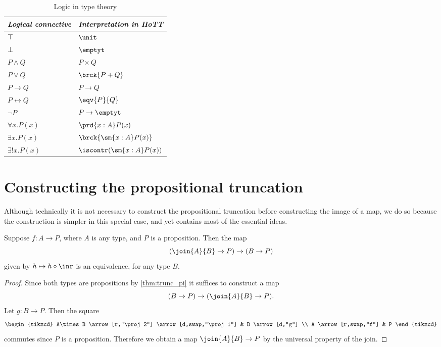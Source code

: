 \begin{table}
\caption{\label{table:logic}Logic in type theory}
\begin{center}
\begin{tabular}{ll}
\toprule
\emph{Logical connective} & \emph{Interpretation in HoTT} \\
\midrule
$\top$ & $\unit$ \\
$\bot$ & $\emptyt$ \\
$P\land Q$ & $P\times Q$ \\
$P\lor Q$ & $\brck{P+Q}$ \\
$P\to Q$ & $P\to Q$ \\
$P\leftrightarrow Q$ & $\eqv{P}{Q}$ \\
$\neg P$ & $P\to\emptyt$ \\
$\forall x.P(x)$ & $\prd{x:A}P(x)$ \\
$\exists x.P(x)$ & $\brck{\sm{x:A}P(x)}$ \\
$\exists! x.P(x)$ & $\iscontr(\sm{x:A}P(x))$ \\
\bottomrule
\end{tabular}
\end{center}
\end{table}

\section{Constructing the propositional truncation}
Although technically it is not necessary to construct the propositional truncation before constructing the image of a map, we do so because the construction is simpler in this special case, and yet contains most of the essential ideas.

\begin{lem}\label{lem:extend_join_prop}
Suppose $f:A\to P$, where $A$ is any type, and $P$ is a proposition.
Then the map
\begin{equation*}
(\join{A}{B}\to P)\to (B\to P)
\end{equation*}
given by $h\mapsto h\circ \inr$ is an equivalence, for any type $B$.
\end{lem}

\begin{proof}
Since both types are propositions by \cref{thm:trunc_pi} it suffices to construct a map
\begin{equation*}
(B\to P)\to (\join{A}{B}\to P).
\end{equation*}
Let $g:B\to P$. Then the square
\begin{equation*}
\begin{tikzcd}
A\times B \arrow[r,"\proj 2"] \arrow[d,swap,"\proj 1"] & B \arrow[d,"g"] \\
A \arrow[r,swap,"f"] & P
\end{tikzcd}
\end{equation*}
commutes since $P$ is a proposition. Therefore we obtain a map $\join{A}{B}\to P$ by the universal property of the join.
\end{proof}

